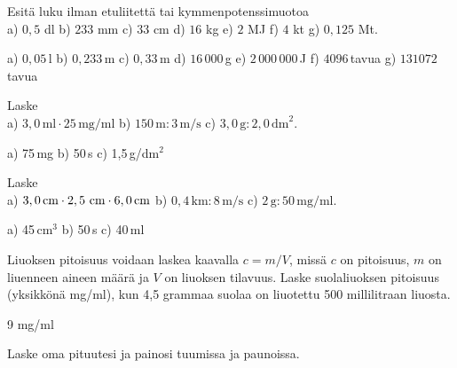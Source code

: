 \begin{tehtavasivu}

\begin{tehtava}
Esitä luku ilman etuliitettä tai kymmenpotenssimuotoa \\
a) $0,5$ dl \qquad
b) $233$ mm \qquad
c) $33$ cm \qquad
d) $16$ kg \qquad
e) $2$ MJ \qquad
f) $4$ kt \qquad
g) $0,125$ Mt.
\begin{vastaus}
a) $0,05$\,l \qquad
b) $0,233$\,m \qquad
c) $0,33$\,m \qquad
d) $16\,000$\,g \qquad
e) $2\,000\,000$\,J \qquad
f) $4096$\,tavua \qquad
g) $131072$\,tavua
\end{vastaus}
\end{tehtava}

\begin{tehtava}
Laske \\
a) $3,0\,\textrm{ml} \cdot 25\,\textrm{mg/ml}$ \qquad
b) $150\,\textrm{m} : 3\,\textrm{m/s}$ \qquad
c) $3,0\,\textrm{g} : 2,0\,\textrm{dm}^2$.
\begin{vastaus}
a) 75\,mg \qquad
b) 50\,s \qquad
c) 1,5\,g/dm$^2$
\end{vastaus}
\end{tehtava}

\begin{tehtava}
Laske \\
a) $3,0\,\textrm{cm} \cdot 2,5\,\textrm{\,cm} \cdot 6,0\,\textrm{cm}$ \qquad
b) $0,4\,\textrm{km} : 8\,\textrm{m/s}$ \qquad
c) $2\,\textrm{g} : 50\,\textrm{mg/ml}$.
\begin{vastaus}
a) 45\,cm$^3$ \qquad
b) 50\,s \qquad
c) 40\,ml
\end{vastaus}
\end{tehtava}



\begin{tehtava}
Liuoksen pitoisuus voidaan laskea kaavalla $c=m/V$, missä $c$ on pitoisuus, $m$ on liuenneen aineen määrä ja $V$ on liuoksen tilavuus. Laske suolaliuoksen pitoisuus (yksikkönä mg/ml), kun 4,5 grammaa suolaa on liuotettu 500 millilitraan liuosta.
\begin{vastaus}
9 mg/ml
\end{vastaus}
\end{tehtava}

\begin{tehtava}
Laske oma pituutesi ja painosi tuumissa ja paunoissa.
\end{tehtava}


\end{tehtavasivu}
